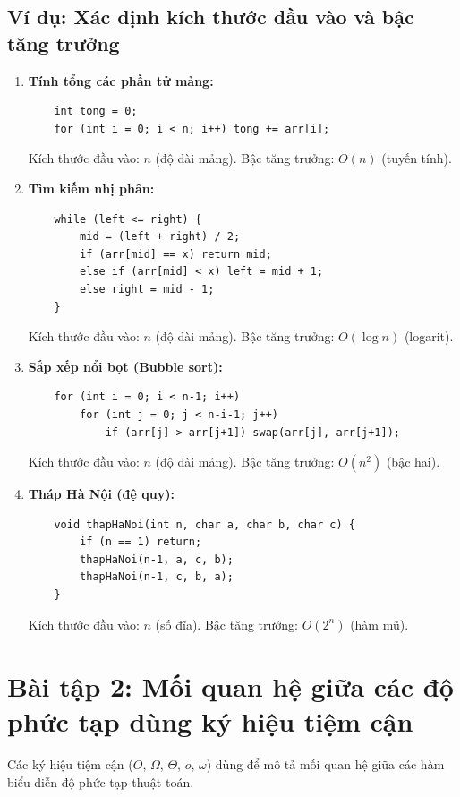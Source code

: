 \documentclass[12pt,a4paper]{article}
\begin{document}
\subsection*{Ví dụ: Xác định kích thước đầu vào và bậc tăng trưởng}
\begin{enumerate}[label=\arabic*.]
    \item \textbf{Tính tổng các phần tử mảng:}
    \begin{verbatim}
    int tong = 0;
    for (int i = 0; i < n; i++) tong += arr[i];
    \end{verbatim}
    Kích thước đầu vào: $n$ (độ dài mảng).  
    Bậc tăng trưởng: $O(n)$ (tuyến tính).

    \item \textbf{Tìm kiếm nhị phân:}
    \begin{verbatim}
    while (left <= right) {
        mid = (left + right) / 2;
        if (arr[mid] == x) return mid;
        else if (arr[mid] < x) left = mid + 1;
        else right = mid - 1;
    }
    \end{verbatim}
    Kích thước đầu vào: $n$ (độ dài mảng).  
    Bậc tăng trưởng: $O(\log n)$ (logarit).

    \item \textbf{Sắp xếp nổi bọt (Bubble sort):}
    \begin{verbatim}
    for (int i = 0; i < n-1; i++)
        for (int j = 0; j < n-i-1; j++)
            if (arr[j] > arr[j+1]) swap(arr[j], arr[j+1]);
    \end{verbatim}
    Kích thước đầu vào: $n$ (độ dài mảng).  
    Bậc tăng trưởng: $O(n^2)$ (bậc hai).

    \item \textbf{Tháp Hà Nội (đệ quy):}
    \begin{verbatim}
    void thapHaNoi(int n, char a, char b, char c) {
        if (n == 1) return;
        thapHaNoi(n-1, a, c, b);
        thapHaNoi(n-1, c, b, a);
    }
    \end{verbatim}
    Kích thước đầu vào: $n$ (số đĩa).  
    Bậc tăng trưởng: $O(2^n)$ (hàm mũ).
\end{enumerate}

\section*{Bài tập 2: Mối quan hệ giữa các độ phức tạp dùng ký hiệu tiệm cận}

Các ký hiệu tiệm cận ($O$, $\Omega$, $\Theta$, $o$, $\omega$) dùng để mô tả mối quan hệ giữa các hàm biểu diễn độ phức tạp thuật toán.
\end{document}
